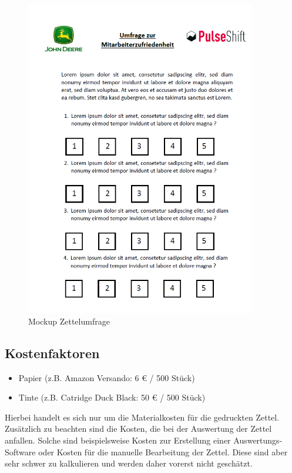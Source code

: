\begin{figure}[H]
\centering
\includegraphics[width=0.9\textwidth]{images/portfolio/paper_survey}
\caption[Mockup Zettelumfrage]{Mockup Zettelumfrage}
\label{fig:portfolio:paper_survey}
\end{figure}

\subsection{Kostenfaktoren}

\begin{itemize}
\item Papier (z.B. Amazon Versando:	6 € / 500 Stück)
\item Tinte (z.B. Catridge Duck Black: 50 € / 500 Stück)
\end{itemize}

Hierbei handelt es sich nur um die Materialkosten für die gedruckten Zettel. Zusätzlich zu beachten sind die Kosten, die bei der Auswertung der Zettel anfallen. Solche sind beispielsweise Kosten zur Erstellung einer Auswertungs-Software oder Kosten für die manuelle Bearbeitung der Zettel. Diese sind aber sehr schwer zu kalkulieren und werden daher vorerst nicht geschätzt.

